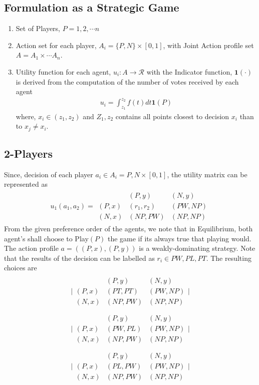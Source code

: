 \documentclass[11pt]{article}
\theoremstyle{definition}
\def\i{\mathbf{1}} %
\begin{document}
\subsection{Formulation as a Strategic Game}
\begin{enumerate}
\item Set of Players, $P = {1,2,\cdots n}$
\item Action set for each player, $A_i = \{P,N\}\times[0,1]$, with Joint Action profile set $A = A_1 \times \cdots A_n$.
\item Utility function for each agent, $u_i: A \rightarrow \mathcal{R}$ with the Indicator function, $\i(\cdot)$ is derived from the computation of the number of votes received by each agent
\begin{align*}
u_i = \int_{z_1}^{z_2}f(t)dt \i(P)
\end{align*}
where, $x_i \in (z_1,z_2)$ and $Z_1,z_2$ contains all points closest to decision $x_i$ than to $x_j \neq x_i$.
\end{enumerate}

\subsection{2-Players}
Since, decision of each player $a_i \in A_i = {P,N}\times [0,1]$, the utility matrix can be represented as
\begin{align}
u_1(a_1, a_2) = \begin{array}{ccc}
& (P,y)&(N,y)\\
(P,x)&(r_1,r_2)&(PW,NP)\\
(N,x)&(NP,PW)&(NP,NP)
\end{array}
\end{align}
From the given preference order of the agents, we note that in Equilibrium, both agent's shall choose to Play$(P)$ the game if its always true that playing would. The action profile $a = ((P,x),(P,y))$ is a weakly-dominating strategy. Note that the results of the decision can be labelled as $r_i \in {PW,PL,PT}$. The resulting choices are
\begin{align}
\begin{array}{c}
\bigg|\begin{array}{ccc}
& (P,y)&(N,y)\\
(P,x)&(PT,PT)&(PW,NP)\\
(N,x)&(NP,PW)&(NP,NP)
\end{array}\bigg|
\\ \\
\bigg|\begin{array}{ccc}
& (P,y)&(N,y)\\
(P,x)&(PW,PL)&(PW,NP)\\
(N,x)&(NP,PW)&(NP,NP)
\end{array}\bigg|
\\ \\
\bigg|\begin{array}{ccc}
& (P,y)&(N,y)\\
(P,x)&(PL,PW)&(PW,NP)\\
(N,x)&(NP,PW)&(NP,NP)
\end{array}\bigg|
\end{array}
\end{align}
\end{document}

